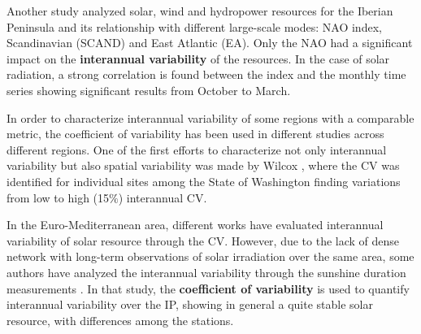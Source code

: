 Another study analyzed solar, wind and hydropower resources for the Iberian Peninsula and its relationship with different large-scale modes: NAO index, Scandinavian (SCAND) and East Atlantic (EA). Only the NAO had a significant impact on the \textbf{interannual variability} of the resources. In the case of solar radiation, a strong correlation is found between the index and the monthly time series \cite*{Jerez2013a} showing significant results from October to March.

In order to characterize interannual variability of some regions with a comparable metric, the coefficient of variability has been used in different studies across different regions. One of the first efforts to characterize not only interannual variability but also spatial variability was made by Wilcox \cite*{GueymardWilcox2011a}, where the CV was identified for individual sites among the State of Washington finding variations from low to high (15$\%$) interannual CV.


In the Euro-Mediterranean area, different works have evaluated interannual variability of solar resource through the CV. However, due to the lack of dense network with long-term observations of solar irradiation over the same area, some authors have analyzed the interannual variability through the sunshine duration measurements \cite*{Gil2015}. In that study, the \textbf{coefficient of variability} is used to quantify interannual variability over the IP, showing in general a quite stable solar resource, with differences among the stations. %




 

